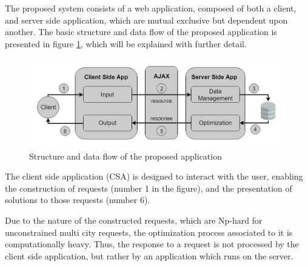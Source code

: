 
The proposed system consists of a web application, composed of both a client, and server side application,
which are mutual exclusive but dependent upon another.
The basic structure and data flow of the proposed application is 
presented in figure \ref{fig:system_architecture_design}, which will 
be explained with further detail.


\begin{figure}[htpb]
  \centering
  \includegraphics[width=\textwidth]{./Figures/system_design/system_architecture_design.png}
	\caption{Structure and data flow of the proposed application}
  \label{fig:system_architecture_design}  
\end{figure}


The client side application (CSA) is designed to interact with the user,
enabling the construction of requests (number 1 in the figure), 
and the presentation of solutions to those requests (number 6).


Due to the nature of the constructed requests, which are Np-hard for unconstrained multi city requests,
the optimization process associated to it is computationally heavy.
Thus, the response to a request is not processed by the client side application,
but rather by an application which runs on the server. 

